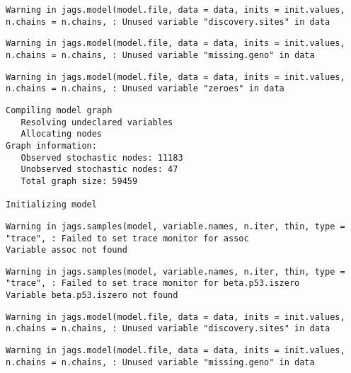 \documentclass[12pt,twoside]{dukestatscithesis}
\theoremstyle{definition}
\theoremstyle{definition}
\theoremstyle{definition}
\theoremstyle{remark}
\begin{document}
\begin{verbatim}
Warning in jags.model(model.file, data = data, inits = init.values,
n.chains = n.chains, : Unused variable "discovery.sites" in data
\end{verbatim}
\begin{verbatim}
Warning in jags.model(model.file, data = data, inits = init.values,
n.chains = n.chains, : Unused variable "missing.geno" in data
\end{verbatim}
\begin{verbatim}
Warning in jags.model(model.file, data = data, inits = init.values,
n.chains = n.chains, : Unused variable "zeroes" in data
\end{verbatim}
\begin{verbatim}
Compiling model graph
   Resolving undeclared variables
   Allocating nodes
Graph information:
   Observed stochastic nodes: 11183
   Unobserved stochastic nodes: 47
   Total graph size: 59459

Initializing model
\end{verbatim}
\begin{verbatim}
Warning in jags.samples(model, variable.names, n.iter, thin, type = "trace", : Failed to set trace monitor for assoc
Variable assoc not found
\end{verbatim}
\begin{verbatim}
Warning in jags.samples(model, variable.names, n.iter, thin, type = "trace", : Failed to set trace monitor for beta.p53.iszero
Variable beta.p53.iszero not found
\end{verbatim}
\begin{Shaded}
\begin{Highlighting}[]
\StringTok{ }\NormalTok{(}\NormalTok{, }
\end{Highlighting}
\end{Shaded}
\begin{verbatim}
Warning in jags.model(model.file, data = data, inits = init.values,
n.chains = n.chains, : Unused variable "discovery.sites" in data
\end{verbatim}
\begin{verbatim}
Warning in jags.model(model.file, data = data, inits = init.values,
n.chains = n.chains, : Unused variable "missing.geno" in data
\end{verbatim}
\end{document}
